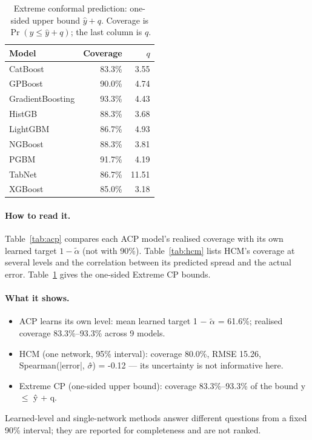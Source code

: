 \documentclass[11pt]{article}
\begin{document}
\begin{table}[t]\centering\small
\caption{Extreme conformal prediction: one-sided upper bound $\hat y+q$. Coverage is $\Pr(y\le\hat y+q)$; the last column is $q$.}\label{tab:extreme}
\begin{tabular}{lrr}\toprule Model & Coverage & $q$\\\midrule
CatBoost & 83.3\% & 3.55\\
GPBoost & 90.0\% & 4.74\\
GradientBoosting & 93.3\% & 4.43\\
HistGB & 88.3\% & 3.68\\
LightGBM & 86.7\% & 4.93\\
NGBoost & 88.3\% & 3.81\\
PGBM & 91.7\% & 4.19\\
TabNet & 86.7\% & 11.51\\
XGBoost & 85.0\% & 3.18\\
\bottomrule\end{tabular}\end{table}
\paragraph{How to read it.} Table~\ref{tab:acp} compares each ACP model's realised coverage with its own learned target $1-\tilde\alpha$ (not with 90\%). Table~\ref{tab:hcm} lists HCM's coverage at several levels and the correlation between its predicted spread and the actual error. Table~\ref{tab:extreme} gives the one-sided Extreme CP bounds.
\paragraph{What it shows.}
\begin{itemize}
\item ACP learns its own level: mean learned target 1 $-$ $\tilde\alpha$ = 61.6\%; realised coverage 83.3\%--93.3\% across 9 models.
\item HCM (one network, 95\% interval): coverage 80.0\%, RMSE 15.26, Spearman(|error|, $\sigma$̂) = -0.12 — its uncertainty is not informative here.
\item Extreme CP (one-sided upper bound): coverage 83.3\%--93.3\% of the bound y $\leq$ ŷ + q.
\end{itemize}
\begin{insight}[Takeaway RQ6]
Learned-level and single-network methods answer different questions from a fixed 90\% interval; they are reported for completeness and are not ranked.
\end{insight}
\end{document}
